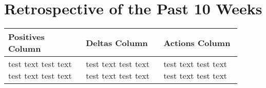 \documentclass[10pt,draftclsnofoot,onecolumn]{IEEEtran}
\begin{document}
\section{Retrospective of the Past 10 Weeks}
\begin{center}
\begin{tabular}{| p{0.3\linewidth} | p{0.3\linewidth} | p{0.3\linewidth} |}
\hline
Positives Column & 
Deltas Column & 
Actions Column \\
\hline
test text test text test text test text &
test text test text test text test text &
test text test text test text test text \\
\hline
\end{tabular}
\end{center}
\end{document}
